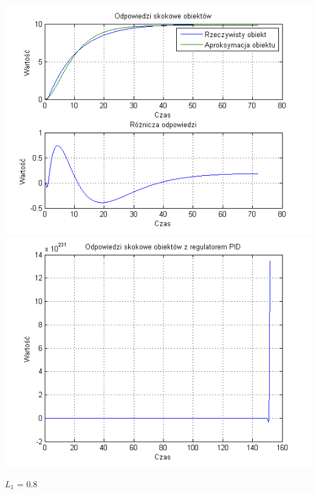 \documentclass[10pt,a4paper]{article}
\begin{document}
\begin{center}
\includegraphics[scale=1]{images/dwa/skrypt_219.png}\\
\includegraphics[scale=1]{images/dwa/skrypt_220.png}\\
\end{center}
\newpage
$L_1$ = 0.8
\end{document}
